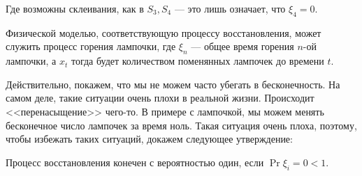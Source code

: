 Где возможны склеивания, как в $S_3, S_4$ --- это лишь означает, что $\xi_4 = 0$.

\begin{example}
  Физической моделью, соответствующую процессу восстановления, может служить
  процесс горения лампочки,
  где $\xi_n$ --- общее время горения $n$-ой лампочки, а $x_t$ тогда будет количеством
  поменянных лампочек до времени $t$.
\end{example}

Действительно, покажем, что мы не можем
часто убегать в бесконечность. На самом деле, такие ситуации очень плохи в реальной
жизни. Происходит <<перенасыщение>> чего-то. В примере с лампочкой, мы можем менять
бесконечное число лампочек за время ноль. Такая ситуация очень плоха, поэтому,
чтобы избежать таких ситуаций, докажем следующее утверждение:

\begin{theorem}
  Процесс восстановления конечен с вероятностью один, если $\Pr{\xi_i = 0} < 1$.
\end{theorem}


